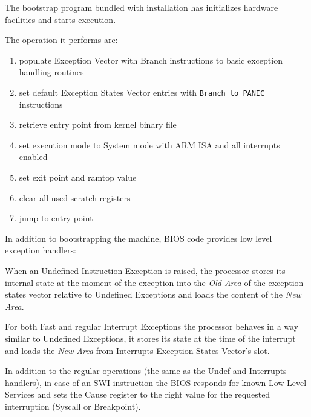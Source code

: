 
\label{sec:man:bios}


The bootstrap program bundled with \uarm{} installation has initializes hardware facilities and starts execution.

The operation it performs are:

\begin{enumerate}
\item populate Exception Vector with Branch instructions to basic exception handling routines
\item set default Exception States Vector entries with \texttt{Branch to PANIC} instructions
\item retrieve entry point from kernel binary file
\item set execution mode to System mode with ARM ISA and all interrupts enabled
\item set exit point and ramtop value
\item clear all used scratch registers
\item jump to entry point
\end{enumerate}


In addition to bootstrapping the machine, BIOS code provides low level exception handlers:


When an Undefined Instruction Exception is raised, the processor stores its internal state at the moment of the exception into the \emph{Old Area} of the exception states vector relative to Undefined Exceptions and loads the content of the \emph{New Area}.


For both Fast and regular Interrupt Exceptions the processor behaves in a way similar to Undefined Exceptions, it stores its state at the time of the interrupt and loads the \emph{New Area} from Interrupts Exception States Vector's slot.


In addition to the regular operations (the same as the Undef and Interrupts handlers), in case of an SWI instruction the BIOS responds for known Low Level Services and sets the Cause register to the right value for the requested interruption (Syscall or Breakpoint).

